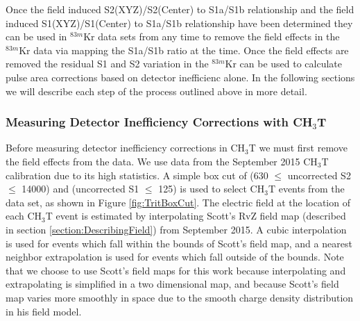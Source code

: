 \documentclass[a4paper,12pt]{article}
\begin{document}
{Once the field induced S2(XYZ)/S2(Center) to S1a/S1b relationship and the field induced S1(XYZ)/S1(Center) to S1a/S1b relationship have been determined they can be used in $^{83m}$Kr data sets from any time to remove the field effects in the $^{83m}$Kr data via mapping the S1a/S1b ratio at the time.  Once the field effects are removed the residual S1 and S2 variation in the $^{83m}$Kr can be used to calculate pulse area corrections based on detector inefficienc alone.  In the following sections we will describe each step of the process outlined above in more detail.

\subsubsection{Measuring Detector Inefficiency Corrections with CH$_3$T}

Before measuring detector inefficiency corrections in CH$_3$T we must first remove the field effects from the data.  We use data from the September 2015 CH$_3$T calibration due to its high statistics.  A simple box cut of (630 $\leq$ uncorrected S2 $\leq$ 14000) and (uncorrected S1 $\leq$ 125) is used to select CH$_3$T events from the data set, as shown in Figure \ref{fig:TritBoxCut}. The electric field at the location of each CH$_3$T event is estimated by interpolating Scott's RvZ field map (described in section \ref{section:DescribingField}) from September 2015.  A cubic interpolation is used for events which fall within the bounds of Scott's field map, and a nearest neighbor extrapolation is used for events which fall outside of the bounds.   Note that we choose to use Scott's field maps for this work because interpolating and extrapolating is simplified in a two dimensional map, and because Scott's field map varies more smoothly in space due to the smooth charge density distribution in his field model. 

}
\end{document}
